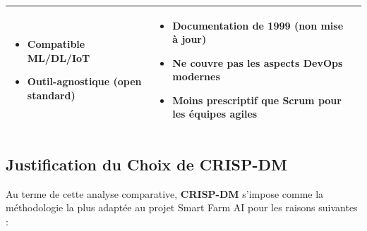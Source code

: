 \documentclass[12pt, a4paper]{report}
\begin{document}
\begin{table}[H]
\begin{tabularx}{\textwidth}{l X X}
\begin{itemize}[leftmargin=*,topsep=0pt]
    \item Compatible ML/DL/IoT
    \item Outil-agnostique (open standard)
\end{itemize}
&
\begin{itemize}[leftmargin=*,topsep=0pt]
    \item Documentation de 1999 (non mise à jour)
    \item Ne couvre pas les aspects DevOps modernes
    \item Moins prescriptif que Scrum pour les équipes agiles
\end{itemize}
\\
\bottomrule
\end{tabularx}
\end{table}

\subsection{Justification du Choix de CRISP-DM}

Au terme de cette analyse comparative, \textbf{CRISP-DM} s'impose comme la méthodologie la plus adaptée au projet Smart Farm AI pour les raisons suivantes :
\end{document}
